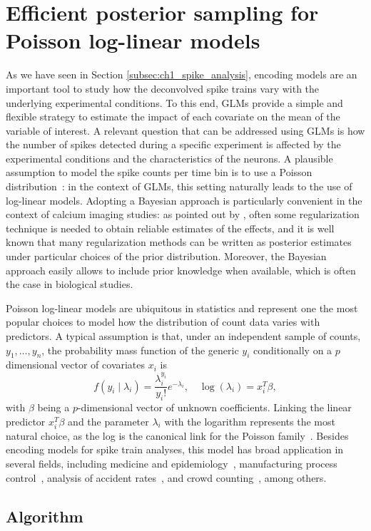 \chapter{Efficient posterior sampling for Poisson log-linear models}



As we have seen in Section \ref{subsec:ch1_spike_analysis}, encoding models are an important tool to study how the deconvolved spike trains vary with the underlying experimental conditions. To this end, GLMs provide a simple and flexible strategy to estimate the impact of each covariate on the mean of the variable of interest.
A relevant question that can be addressed using GLMs is how the number of spikes detected during a specific experiment is affected by the experimental conditions and the characteristics of the neurons. A plausible assumption to model the spike counts per time bin is to use a Poisson distribution~\citep{paninski2007}: in the context of GLMs, this setting naturally leads to the use of log-linear models. 
Adopting a Bayesian approach is particularly convenient in the context of calcium imaging studies: as pointed out by \citet{paninski2007}, often some regularization technique is needed to obtain reliable estimates of the effects, and it is well known that many regularization methods can be written as posterior estimates under particular choices of the prior distribution.
Moreover, the Bayesian approach easily allows to include prior knowledge when available, which is often the case in biological studies. 

Poisson log-linear models are ubiquitous in statistics and represent one the most popular choices to model how the distribution of count data varies with predictors. A typical assumption is that, under an independent sample of counts, $y_1, \dots, y_n$, the probability mass function of the generic $y_i$ conditionally on a $p$ dimensional vector of covariates $x_i$ is
\begin{equation*}
f(y_i \mid \lambda_i) =  \frac {\lambda_i^{y_i}}{{y_i}!}e^{-\lambda_i}, \quad \log(\lambda_i) = x_i^T \beta,
\label{eq:model0}
\end{equation*}
with $\beta$ being a $p$-dimensional vector of unknown coefficients. Linking the linear predictor $x_i^T \beta$ and the parameter $\lambda_i$ with the logarithm represents the most natural choice, as the log is the canonical link for the Poisson family~\citep{nelder1972glm}.
Besides encoding models for spike train analyses, this model has broad application in several fields, including medicine and epidemiology~\citep{Frome1983, frome1985, Hutchinson2005}, manufacturing process control~\citep{lambert1992}, analysis of accident rates~\citep{Sarath1990, Miaou1994}, and crowd counting~\citep{chan2009}, among others.



\section{Algorithm} 
\noindent

